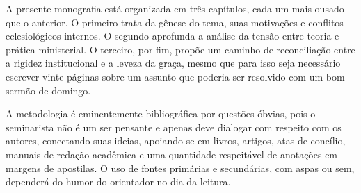A presente monografia está organizada em três capítulos, cada um mais ousado que o anterior. O primeiro trata da gênese do tema, suas motivações e conflitos eclesiológicos internos. O segundo aprofunda a análise da tensão entre teoria e prática ministerial. O terceiro, por fim, propõe um caminho de reconciliação entre a rigidez institucional e a leveza da graça, mesmo que para isso seja necessário escrever vinte páginas sobre um assunto que poderia ser resolvido com um bom sermão de domingo.

A metodologia é eminentemente bibliográfica por questões óbvias, pois o seminarista não é um ser pensante e apenas deve dialogar com respeito com os autores, conectando suas ideias, apoiando-se em livros, artigos, atas de concílio, manuais de redação acadêmica e uma quantidade respeitável de anotações em margens de apostilas. O uso de fontes primárias e secundárias, com aspas ou sem, dependerá do humor do orientador no dia da leitura.

